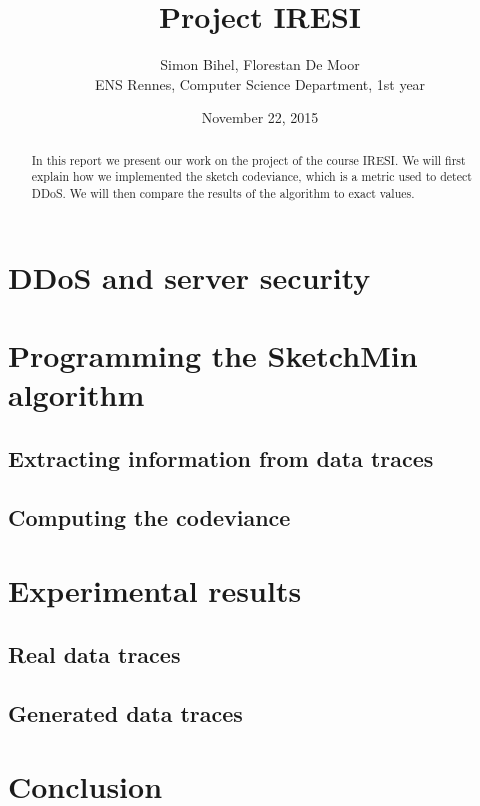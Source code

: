\documentclass[a4paper]{article}%
\begin{document}
\title{Project IRESI}

\author{Simon Bihel, Florestan De Moor \\ ENS Rennes, Computer Science Department, 1st year}

\date{November 22, 2015}

\maketitle

\begin{abstract}
	In this report we present our work on the project of the course IRESI. We will first explain how we implemented the sketch codeviance, which is a metric used to detect DDoS. We will then compare the results of the algorithm to exact values.
\end{abstract}


\section{DDoS and server security}


\section{Programming the SketchMin algorithm}

\subsection{Extracting information from data traces}

\subsection{Computing the codeviance}

\section{Experimental results}

\subsection{Real data traces}

\subsection{Generated data traces}


\section*{Conclusion}

\clearpage
\end{document}
